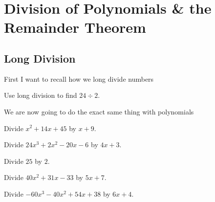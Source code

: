 \section{Division of Polynomials \& the Remainder Theorem}

\subsection{Long Division}

First I want to recall how we long divide numbers

\begin{exercise}
Use long division to find $24\div2$.
\end{exercise}
\begin{solution}[2in]

\end{solution}

We are now going to do the exact same thing with polynomials

\ifprintanswers\else\newpage\fi

\begin{exercise}
Divide $x^2+14x+45$ by $x+9$.
\end{exercise}
\begin{solution}[3in]

\end{solution}

\begin{exercise}
Divide $24x^3+2x^2-20x-6$ by $4x+3$.
\end{exercise}
\begin{solution}[3in]

\end{solution}

\begin{exercise}
Divide $25$ by $2$.
\end{exercise}
\begin{solution}[2in]

\end{solution}

\begin{exercise}
Divide $40x^2+31x-33$ by $5x+7$.
\end{exercise}
\begin{solution}[4in]

\end{solution}

\vspace{0.5em}

\begin{exercise}
Divide $-60x^3-40x^2+54x+38$ by $6x+4$.
\end{exercise}
\begin{solution}[4in]

\end{solution}

